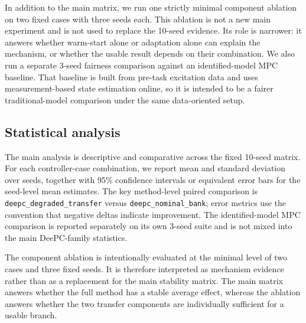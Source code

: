 \documentclass[12pt,a4paper]{article}
\begin{document}
In addition to the main matrix, we run one strictly minimal component ablation on two fixed cases with three seeds each. This ablation is not a new main experiment and is not used to replace the 10-seed evidence. Its role is narrower: it answers whether warm-start alone or adaptation alone can explain the mechanism, or whether the usable result depends on their combination. We also run a separate 3-seed fairness comparison against an identified-model MPC baseline. That baseline is built from pre-task excitation data and uses measurement-based state estimation online, so it is intended to be a fairer traditional-model comparison under the same data-oriented setup.

\subsection{Statistical analysis}

The main analysis is descriptive and comparative across the fixed 10-seed matrix. For each controller-case combination, we report mean and standard deviation over seeds, together with 95\% confidence intervals or equivalent error bars for the seed-level mean estimates. The key method-level paired comparison is \texttt{deepc\_degraded\_transfer} versus \texttt{deepc\_nominal\_bank}; error metrics use the convention that negative deltas indicate improvement. The identified-model MPC comparison is reported separately on its own 3-seed suite and is not mixed into the main DeePC-family statistics.

The component ablation is intentionally evaluated at the minimal level of two cases and three fixed seeds. It is therefore interpreted as mechanism evidence rather than as a replacement for the main stability matrix. The main matrix answers whether the full method has a stable average effect, whereas the ablation answers whether the two transfer components are individually sufficient for a usable branch.
\end{document}
